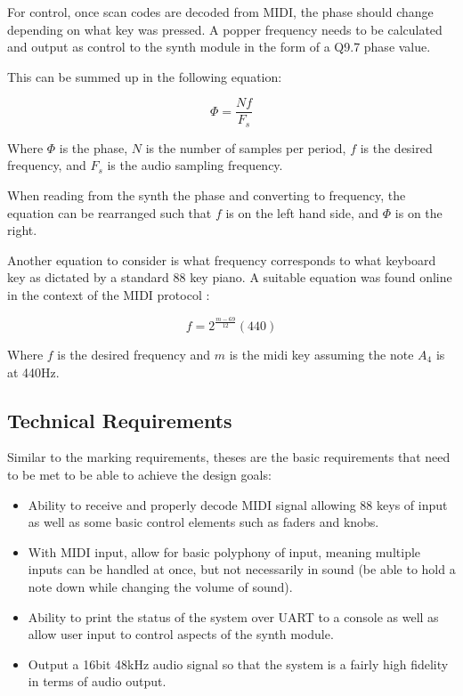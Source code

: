 \documentclass[12pt]{article}
\begin{document}
For control, once scan codes are decoded from MIDI, the phase should change depending on what key was pressed. A popper frequency needs to be calculated and output as control to the synth module in the form of a Q9.7 phase value.

This can be summed up in the following equation:

\begin{equation} \label{eq:phase}
    \Phi = \frac{Nf}{F_s} 
\end{equation}

Where $\Phi$ is the phase, $N$ is the number of samples per period, $f$ is the desired frequency, and $F_s$ is the audio sampling frequency.

When reading from the synth the phase and converting to frequency, the equation can be rearranged such that $f$ is on the left hand side, and $\Phi$ is on the right.

Another equation to consider is what frequency corresponds to what keyboard key as dictated by a standard 88 key piano. A suitable equation was found online in the context of the MIDI protocol \cite{wolfe}:

\begin{equation} \label{eq:midi_freq}
    f = 2^{\frac{m-69}{12}}(440)
\end{equation}

Where $f$ is the desired frequency and $m$ is the midi key assuming the note $A_4$ is at 440Hz.

\subsection{Technical Requirements}

Similar to the marking requirements, theses are the basic requirements that need to be met to be able to achieve the design goals:

\begin{itemize}
    \item Ability to receive and properly decode MIDI signal allowing 88 keys of input as well as some basic control elements such as faders and knobs.
    \item With MIDI input, allow for basic polyphony of input, meaning multiple inputs can be handled at once, but not necessarily in sound (be able to hold a note down while changing the volume of sound).
    \item Ability to print the status of the system over UART to a console as well as allow user input to control aspects of the synth module.
    \item Output a 16bit 48kHz audio signal so that the system is a fairly high fidelity in terms of audio output.
\end{itemize}
\end{document}
